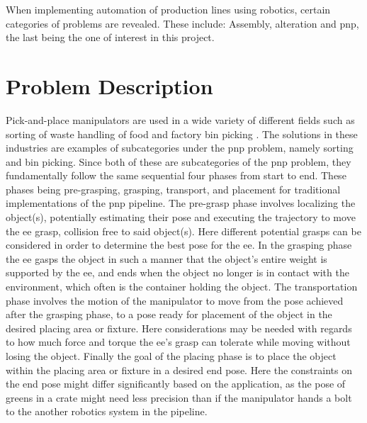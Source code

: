 When implementing automation of production lines using robotics, certain categories of problems are revealed. These include: Assembly, alteration and \gls{pnp}, the last being the one of interest in this project. 

\section{Problem Description}\label{sec:intro-problem-description}
Pick-and-place \gls{manipulator}s are used in a wide variety of different fields such as 
sorting of waste \cite*{robotic-pick-and-toss-facilitates-urban-waste-sorting}
handling of food \cite*{automation-of-mobile-pick-and-place-robotic-system-for-small-food-industry}\cite*{development-of-a-food-handling-soft-robot-hand-considering-a-high-speed-pick-and-place-task} and factory bin picking \cite*{real-time-industrial-bin-picking-with-a-hybrid-deep-learning-engineering-approach} \cite*{a-bin-picking-benchmark-for-systematic-evaluation-of-robotic-pick-and-place-systems} \cite{generic-development-of-bin-pick-and-place-system-based-on-robot-operating-system}. The solutions in these industries are examples of subcategories under the \gls{pnp} problem, namely sorting and bin picking. Since both of these are subcategories of the \gls{pnp} problem, they fundamentally follow the same sequential four phases from start to end. 
These phases being pre-grasping, grasping, transport, and placement \cite*{a-bin-picking-benchmark-for-systematic-evaluation-of-robotic-pick-and-place-systems} for traditional implementations of the \gls{pnp} pipeline.
The pre-grasp phase involves localizing the object(s), potentially estimating their pose and executing the trajectory to move the \gls{ee} grasp, collision free to said object(s). Here different potential grasps can be considered in order to determine the best pose for the \gls{ee}.
In the grasping phase the \gls{ee} gasps the object in such a manner that the object's entire weight is supported by the \gls{ee}, and ends when the object no longer is in contact with the environment, which often is the container holding the object.
The transportation phase involves the motion of the \gls{manipulator} to move from the pose achieved after the grasping phase, to a pose ready for placement of the object in the desired placing area or fixture. Here considerations may be needed with regards to how much force and torque the \gls{ee}'s grasp can tolerate while moving without losing the object.
Finally the goal of the placing phase is to place the object within the placing area or fixture in a desired end pose. Here the constraints on the end pose might differ significantly based on the application, as the pose of greens in a crate might need less precision than if the manipulator hands a bolt to the another robotics system in the pipeline. \medskip

